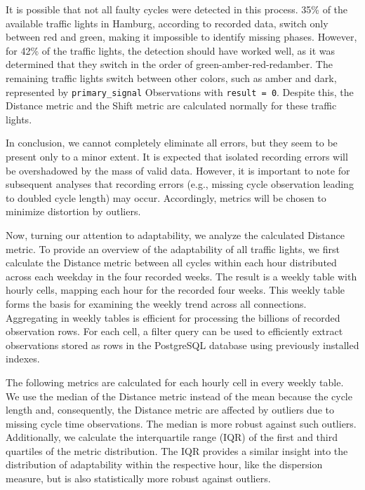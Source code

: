 It is possible that not all faulty cycles were detected in this process. 35\% of the available traffic lights in Hamburg, according to recorded data, switch only between red and green, making it impossible to identify missing phases. However, for 42\% of the traffic lights, the detection should have worked well, as it was determined that they switch in the order of green-amber-red-redamber. The remaining traffic lights switch between other colors, such as amber and dark, represented by \texttt{primary\_signal} Observations with \texttt{result = 0}. Despite this, the Distance metric and the Shift metric are calculated normally for these traffic lights.

In conclusion, we cannot completely eliminate all errors, but they seem to be present only to a minor extent. It is expected that isolated recording errors will be overshadowed by the mass of valid data. However, it is important to note for subsequent analyses that recording errors (e.g., missing cycle observation leading to doubled cycle length) may occur. Accordingly, metrics will be chosen to minimize distortion by outliers.

Now, turning our attention to adaptability, we analyze the calculated Distance metric. To provide an overview of the adaptability of all traffic lights, we first calculate the Distance metric between all cycles within each hour distributed across each weekday in the four recorded weeks. The result is a weekly table with hourly cells, mapping each hour for the recorded four weeks. This weekly table forms the basis for examining the weekly trend across all connections. Aggregating in weekly tables is efficient for processing the billions of recorded observation rows. For each cell, a filter query can be used to efficiently extract observations stored as rows in the PostgreSQL database using previously installed indexes.

The following metrics are calculated for each hourly cell in every weekly table. We use the median of the Distance metric instead of the mean because the cycle length and, consequently, the Distance metric are affected by outliers due to missing cycle time observations. The median is more robust against such outliers. Additionally, we calculate the interquartile range (IQR) of the first and third quartiles of the metric distribution. The IQR provides a similar insight into the distribution of adaptability within the respective hour, like the dispersion measure, but is also statistically more robust against outliers.


